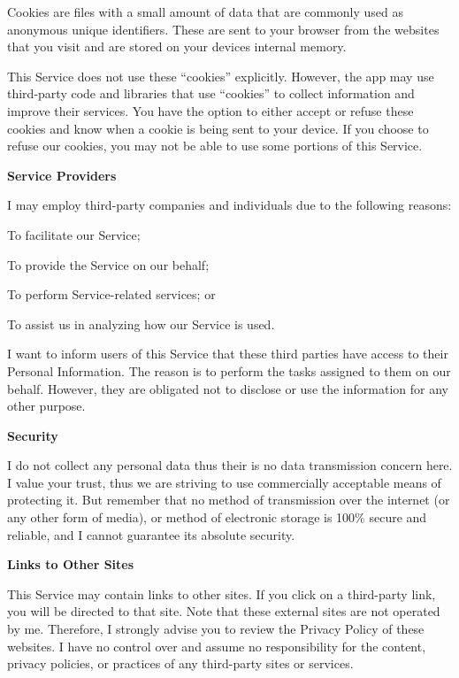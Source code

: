 Cookies are files with a small amount of data that are commonly used as anonymous unique identifiers. These are sent to your browser from the websites that you visit and are stored on your device\textquotesingle{}s internal memory.

This Service does not use these “cookies” explicitly. However, the app may use third-\/party code and libraries that use “cookies” to collect information and improve their services. You have the option to either accept or refuse these cookies and know when a cookie is being sent to your device. If you choose to refuse our cookies, you may not be able to use some portions of this Service.

{\bfseries{Service Providers}}

I may employ third-\/party companies and individuals due to the following reasons\+:


\begin{DoxyItemize}
\item To facilitate our Service;
\item To provide the Service on our behalf;
\item To perform Service-\/related services; or
\item To assist us in analyzing how our Service is used.
\end{DoxyItemize}

I want to inform users of this Service that these third parties have access to their Personal Information. The reason is to perform the tasks assigned to them on our behalf. However, they are obligated not to disclose or use the information for any other purpose.

{\bfseries{Security}}

I do not collect any personal data thus their is no data transmission concern here. I value your trust, thus we are striving to use commercially acceptable means of protecting it. But remember that no method of transmission over the internet (or any other form of media), or method of electronic storage is 100\% secure and reliable, and I cannot guarantee its absolute security.

{\bfseries{Links to Other Sites}}

This Service may contain links to other sites. If you click on a third-\/party link, you will be directed to that site. Note that these external sites are not operated by me. Therefore, I strongly advise you to review the Privacy Policy of these websites. I have no control over and assume no responsibility for the content, privacy policies, or practices of any third-\/party sites or services.

